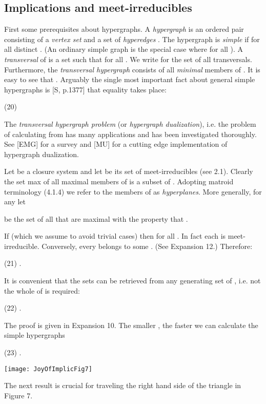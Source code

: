\documentclass[11pt]{article}
\begin{document}
\subsection{Implications and meet-irreducibles}

First some prerequisites about hypergraphs.
A {\it hypergraph} is an ordered pair  consisting of a {\it vertex set}  and  a set of {\it hyperedges} . The hypergraph is {\it simple} if  for all distinct . (An ordinary simple graph is the special case where  for all ). A {\it transversal} of  is a set  such that  for all . We write  for the set of all transversals. Furthermore, the {\it transversal hypergraph}  consists of all {\it minimal} members of  . It is easy to see that . Arguably the single most important fact about general simple hypergraphs is [S, p.1377] that equality takes place:

(20) \quad 

The {\it transversal hypergraph problem} (or {\it hypergraph dualization}), i.e. the problem of calculating  from  has many applications and has been investigated thoroughly. See [EMG] for a survey and [MU] for a cutting edge implementation of hypergraph dualization.

Let  be a closure system and let  be its set of meet-irreducibles (see 2.1). 
Clearly the set max of all maximal members of  is a subset of . Adopting matroid terminology (4.1.4) we refer to the members of  as {\it hyperplanes}. More generally, for any  let 
\begin{center}
 be the set of all  that are maximal with the property that . 
\end{center}
If  (which we assume to avoid trivial cases) then  for all . In fact each  is meet-irreducible.
Conversely, every  belongs to some . (See Expansion 12.)  
Therefore:

(21) \quad .

It is convenient that the sets  can be retrieved from any generating set  of , i.e. not the whole of  is required:

(22) \quad .  


The proof is given in Expansion 10. 
The smaller , the faster we can calculate the simple hypergraphs

(23) \quad .


\begin{center}
\texttt{[image: JoyOfImplicFig7]}
\end{center}


The next result is crucial for traveling the right hand side of the triangle in Figure 7.
\end{document}
